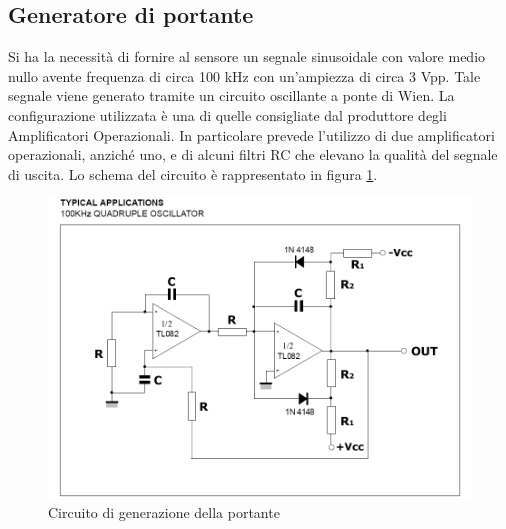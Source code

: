 \documentclass[12pt,a4paper,oneside,openright,italian]{article}
\begin{document}
\subsection{Generatore di portante}
Si ha la necessit\`a di fornire al sensore un segnale sinusoidale con valore medio nullo avente frequenza di circa 100 kHz con un'ampiezza di circa 3 Vpp. Tale segnale viene generato tramite un circuito oscillante a ponte di Wien. La configurazione utilizzata \`e una di quelle consigliate dal produttore degli Amplificatori Operazionali. In particolare prevede l'utilizzo di due amplificatori operazionali, anzich\'e uno, e di alcuni filtri RC che elevano la qualit\`a del segnale di uscita. Lo schema del circuito \`e rappresentato in figura \ref{portante}.
\begin{figure}[!hbp]
  \centering
  \includegraphics[width=350pt]{immagini/portante.png}
  \caption{Circuito di generazione della portante}
  \label{portante}
\end{figure}
\end{document}
